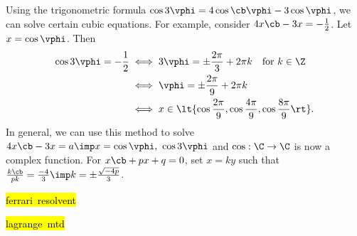 \documentclass[a4paper]{article}
\begin{document}
\quad
Using the trigonometric formula $ \cos 3\vphi = 4\cos\cb \vphi-3\cos\vphi $, we can solve certain cubic equations.
For example, consider $ 4x\cb-3x=-\frac{1}{2} $.
Let $ x=\cos \vphi $.
Then \begin{align*}
  \cos 3\vphi = -\frac{1}{2} &\iff 3\vphi = \pm \frac{2\pi}{3}+2\pi k \quad \text{for } k\in \Z \\
  &\iff \vphi = \pm\frac{2\pi}{9}+2\pi k \\
  &\iff x \in \lt\{ \cos\frac{2\pi}{9},\cos\frac{4\pi}{9},\cos\frac{8\pi}{9} \rt\}.
\end{align*}
In general, we can use this method to solve $ 4x\cb-3x=a \imp x=\cos\vphi,\ \cos 3\vphi $ and $ \cos:\C\to\C $ is now a complex function.
For $ x\cb+px+q = 0 $, set $ x=ky $ such that $ \frac{k\cb}{pk} = \frac{-4}{3} \imp k = \pm\frac{\sqrt{-4p}}{3} $.

\hl{\mbox{ferrari resolvent}}

\hl{\mbox{lagrange mtd}}
\end{document}
